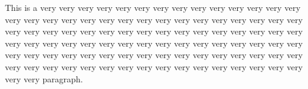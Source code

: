 
This is a very very very very very very very very very very very very very very very very very very very very very very very very very very very very very very very very very very very very very very very very very very very very very very very very very very very very very very very very very very very very very very very very very very very very very very very very very very very very very very very very very very very very very very very very very very very very very very very very paragraph.